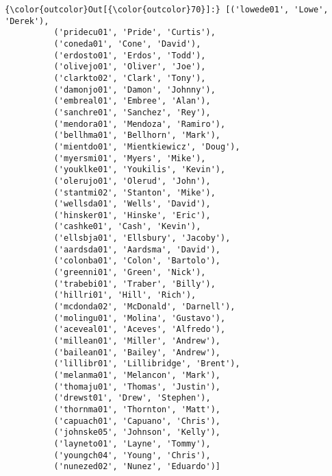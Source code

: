 \documentclass[11pt]{article}
\begin{document}
\begin{Verbatim}[commandchars=\\\{\}]
{\color{outcolor}Out[{\color{outcolor}70}]:} [('lowede01', 'Lowe', 'Derek'),
          ('pridecu01', 'Pride', 'Curtis'),
          ('coneda01', 'Cone', 'David'),
          ('erdosto01', 'Erdos', 'Todd'),
          ('olivejo01', 'Oliver', 'Joe'),
          ('clarkto02', 'Clark', 'Tony'),
          ('damonjo01', 'Damon', 'Johnny'),
          ('embreal01', 'Embree', 'Alan'),
          ('sanchre01', 'Sanchez', 'Rey'),
          ('mendora01', 'Mendoza', 'Ramiro'),
          ('bellhma01', 'Bellhorn', 'Mark'),
          ('mientdo01', 'Mientkiewicz', 'Doug'),
          ('myersmi01', 'Myers', 'Mike'),
          ('youklke01', 'Youkilis', 'Kevin'),
          ('olerujo01', 'Olerud', 'John'),
          ('stantmi02', 'Stanton', 'Mike'),
          ('wellsda01', 'Wells', 'David'),
          ('hinsker01', 'Hinske', 'Eric'),
          ('cashke01', 'Cash', 'Kevin'),
          ('ellsbja01', 'Ellsbury', 'Jacoby'),
          ('aardsda01', 'Aardsma', 'David'),
          ('colonba01', 'Colon', 'Bartolo'),
          ('greenni01', 'Green', 'Nick'),
          ('trabebi01', 'Traber', 'Billy'),
          ('hillri01', 'Hill', 'Rich'),
          ('mcdonda02', 'McDonald', 'Darnell'),
          ('molingu01', 'Molina', 'Gustavo'),
          ('aceveal01', 'Aceves', 'Alfredo'),
          ('millean01', 'Miller', 'Andrew'),
          ('bailean01', 'Bailey', 'Andrew'),
          ('lillibr01', 'Lillibridge', 'Brent'),
          ('melanma01', 'Melancon', 'Mark'),
          ('thomaju01', 'Thomas', 'Justin'),
          ('drewst01', 'Drew', 'Stephen'),
          ('thornma01', 'Thornton', 'Matt'),
          ('capuach01', 'Capuano', 'Chris'),
          ('johnske05', 'Johnson', 'Kelly'),
          ('layneto01', 'Layne', 'Tommy'),
          ('youngch04', 'Young', 'Chris'),
          ('nunezed02', 'Nunez', 'Eduardo')]
\end{Verbatim}
            
\end{document}
